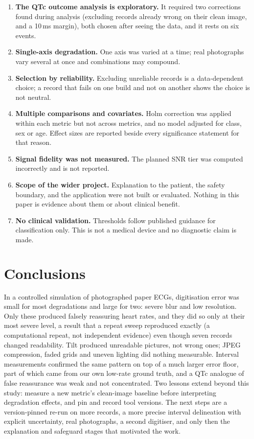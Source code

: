 \begin{enumerate}
\item \textbf{The QTc outcome analysis is exploratory.} It required two corrections found during analysis (excluding records already wrong on their clean image, and a 10\,ms margin), both chosen after seeing the data, and it rests on six events.
\item \textbf{Single-axis degradation.} One axis was varied at a time; real photographs vary several at once and combinations may compound.
\item \textbf{Selection by reliability.} Excluding unreliable records is a data-dependent choice; a record that fails on one build and not on another shows the choice is not neutral.
\item \textbf{Multiple comparisons and covariates.} Holm correction was applied within each metric but not across metrics, and no model adjusted for class, sex or age. Effect sizes are reported beside every significance statement for that reason.
\item \textbf{Signal fidelity was not measured.} The planned SNR tier was computed incorrectly and is not reported.
\item \textbf{Scope of the wider project.} Explanation to the patient, the safety boundary, and the application were not built or evaluated. Nothing in this paper is evidence about them or about clinical benefit.
\item \textbf{No clinical validation.} Thresholds follow published guidance for classification only. This is not a medical device and no diagnostic claim is made.
\end{enumerate}

\section{Conclusions}
In a controlled simulation of photographed paper ECGs, digitisation error was small for most degradations and large for two: severe blur and low resolution. Only these produced falsely reassuring heart rates, and they did so only at their most severe level, a result that a repeat sweep reproduced exactly (a computational repeat, not independent evidence) even though seven records changed readability. Tilt produced unreadable pictures, not wrong ones; JPEG compression, faded grids and uneven lighting did nothing measurable. Interval measurements confirmed the same pattern on top of a much larger error floor, part of which came from our own low-rate ground truth, and a QTc analogue of false reassurance was weak and not concentrated. Two lessons extend beyond this study: measure a new metric's clean-image baseline before interpreting degradation effects, and pin and record tool versions. The next steps are a version-pinned re-run on more records, a more precise interval delineation with explicit uncertainty, real photographs, a second digitiser, and only then the explanation and safeguard stages that motivated the work.

